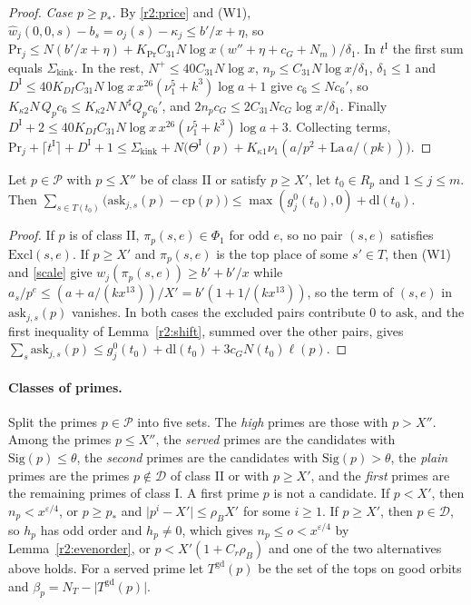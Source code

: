 \begin{proof}
\emph{Case $p\ge p_*$.} By \eqref{r2:price} and (W1), $\hat w_j(0,0,s)-b_s=o_j(s)-\kappa_j\le b'/x+\eta$, so $\mathrm{Pr}_j\le N(b'/x+\eta)+K_{\mathrm{Pr}}C_{31}N\log x(w''+\eta+c_G+N_m)/\delta_1$. In $t^{\mathrm I}$ the first sum equals $\Sigma_{\mathrm{kink}}$. In the rest, $N^+\le40C_{31}N\log x$, $n_p\le C_{31}N\log x/\delta_1$, $\delta_1\le1$ and $D^{\mathrm I}\le40K_{DI}C_{31}N\log x\,x^{26}(\nu_1^5+k^3)\log a+1$ give $c_6\le Nc_6'$, so $K_{\kappa2}N\,Q_pc_6\le K_{\kappa2}N\,N^\sharp Q_pc_6'$, and $2n_pc_G\le2C_{31}Nc_G\log x/\delta_1$. Finally $D^{\mathrm I}+2\le40K_{DI}C_{31}N\log x\,x^{26}(\nu_1^5+k^3)\log a+3$. Collecting terms, $\mathrm{Pr}_j+\lceil t^{\mathrm I}\rceil+D^{\mathrm I}+1\le\Sigma_{\mathrm{kink}}+N\big(\Theta^{\mathrm I}(p)+K_{\kappa1}\nu_1(a/p^2+\mathrm{La}\,a/(pk))\big)$.
\end{proof}

\begin{lemma}\label{r2:noop}
Let $p\in\mathcal P$ with $p\le X''$ be of class II or satisfy $p\ge X'$, let $t_0\in R_p$ and $1\le j\le m$. Then $\sum_{s\in T(t_0)}\big(\mathrm{ask}_{j,s}(p)-\mathrm{cp}(p)\big)\le\max(g^0_j(t_0),0)+\mathrm{dl}(t_0)$.
\end{lemma}

\begin{proof}
If $p$ is of class II, $\pi_p(s,e)\in\Phi_1$ for odd $e$, so no pair $(s,e)$ satisfies $\mathrm{Excl}(s,e)$. If $p\ge X'$ and $\pi_p(s,e)$ is the top place of some $s'\in T$, then (W1) and \eqref{scale} give $w_j(\pi_p(s,e))\ge b'+b'/x$ while $a_s/p^e\le(a+a/(kx^{13}))/X'=b'(1+1/(kx^{13}))$, so the term of $(s,e)$ in $\mathrm{ask}_{j,s}(p)$ vanishes. In both cases the excluded pairs contribute $0$ to $\mathrm{ask}$, and the first inequality of Lemma~\ref{r2:shift}, summed over the other pairs, gives $\sum_s\mathrm{ask}_{j,s}(p)\le g^0_j(t_0)+\mathrm{dl}(t_0)+3c_GN(t_0)\ell(p)$.
\end{proof}

\paragraph{Classes of primes.} Split the primes $p\in\mathcal P$ into five sets. The \emph{high} primes are those with $p>X''$. Among the primes $p\le X''$, the \emph{served} primes are the candidates with $\mathrm{Sig}(p)\le\theta$, the \emph{second} primes are the candidates with $\mathrm{Sig}(p)>\theta$, the \emph{plain} primes are the primes $p\notin\mathcal D$ of class II or with $p\ge X'$, and the \emph{first} primes are the remaining primes of class I. A first prime $p$ is not a candidate. If $p<X'$, then $n_p<x^{\varepsilon/4}$, or $p\ge p_*$ and $\lvert p^i-X'\rvert\le\rho_BX'$ for some $i\ge1$. If $p\ge X'$, then $p\in\mathcal D$, so $h_p$ has odd order and $h_p\ne0$, which gives $n_p\le o<x^{\varepsilon/4}$ by Lemma~\ref{r2:evenorder}, or $p<X'(1+C_r\rho_B)$ and one of the two alternatives above holds. For a served prime let $T^{\mathrm{gd}}(p)$ be the set of the tops on good orbits and $\beta_p=N_T-\lvert T^{\mathrm{gd}}(p)\rvert$.

